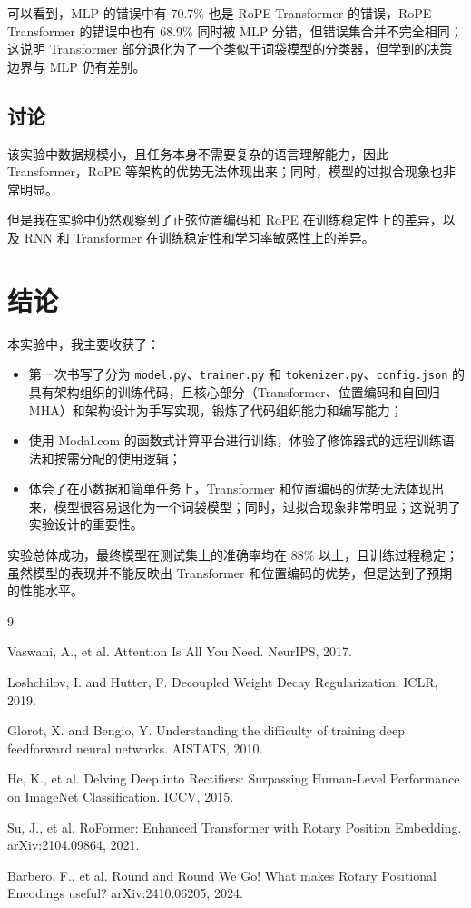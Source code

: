 \documentclass{ctexart}
\begin{document}
可以看到，MLP 的错误中有 70.7\% 也是 RoPE Transformer 的错误，RoPE Transformer 的错误中也有 68.9\% 同时被 MLP 分错，但错误集合并不完全相同；这说明 Transformer 部分退化为了一个类似于词袋模型的分类器，但学到的决策边界与 MLP 仍有差别。

\subsection{讨论}

该实验中数据规模小，且任务本身不需要复杂的语言理解能力，因此 Transformer，RoPE 等架构的优势无法体现出来；同时，模型的过拟合现象也非常明显。

但是我在实验中仍然观察到了正弦位置编码和 RoPE 在训练稳定性上的差异，以及 RNN 和 Transformer 在训练稳定性和学习率敏感性上的差异。

\section{结论}

本实验中，我主要收获了：

\begin{itemize}[noitemsep]
    \item 第一次书写了分为 \verb|model.py|、\verb|trainer.py| 和 \verb|tokenizer.py|、\verb|config.json| 的具有架构组织的训练代码，且核心部分（Transformer、位置编码和自回归 MHA）和架构设计为手写实现，锻炼了代码组织能力和编写能力；
    \item 使用 Modal.com 的函数式计算平台进行训练，体验了修饰器式的远程训练语法和按需分配的使用逻辑；
    \item 体会了在小数据和简单任务上，Transformer 和位置编码的优势无法体现出来，模型很容易退化为一个词袋模型；同时，过拟合现象非常明显；这说明了实验设计的重要性。
\end{itemize}

实验总体成功，最终模型在测试集上的准确率均在 88\% 以上，且训练过程稳定；虽然模型的表现并不能反映出 Transformer 和位置编码的优势，但是达到了预期的性能水平。

\begin{thebibliography}{9}

Vaswani, A., et al. Attention Is All You Need. NeurIPS, 2017.

Loshchilov, I. and Hutter, F. Decoupled Weight Decay Regularization. ICLR, 2019.

Glorot, X. and Bengio, Y. Understanding the difficulty of training deep feedforward neural networks. AISTATS, 2010.

He, K., et al. Delving Deep into Rectifiers: Surpassing Human-Level Performance on ImageNet Classification. ICCV, 2015.

Su, J., et al. RoFormer: Enhanced Transformer with Rotary Position Embedding. arXiv:2104.09864, 2021.

Barbero, F., et al. Round and Round We Go! What makes Rotary Positional Encodings useful? arXiv:2410.06205, 2024.

\end{thebibliography}
\end{document}
